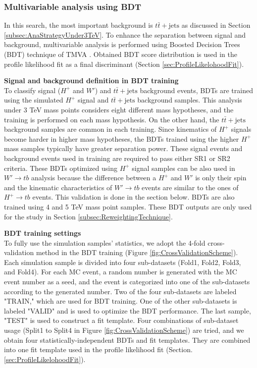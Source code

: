 \subsubsection{Multivariable analysis using BDT}
\label{subsec:MVA}

In this search, the most important background is $t\bar{t}+\text{jets}$ as discussed in Section \ref{subsec:AnaStrategyUnder3TeV}. To enhance the separation between signal and background, multivariable analysis is performed using Boosted Decision Trees (BDT) technique of TMVA \cite{TMVA}. Obtained BDT score distribution is used in the profile likelihood fit as a final discriminant (Section \ref{sec:ProfileLikelohoodFit}).

\begin{description}
    \item{\textbf{Signal and background definition in BDT training}}\mbox{}\\
    To classify signal ($H^{+}$ and $W'$) and $t\bar{t}+\text{jets}$ background events, BDTs are trained using the simulated $H^{+}$ signal and $t\bar{t}+\text{jets}$ background samples. This analysis under 3 TeV mass points considers eight different mass hypotheses, and the training is performed on each mass hypothesis. On the other hand, the $t\bar{t}+\text{jets}$ background samples are common in each training. Since kinematics of $H^+$ signals become harder in higher mass hypotheses, the BDTs trained using the higher $H^{+}$ mass samples typically have greater separation power. These signal events and background events used in training are required to pass either SR1 or SR2 criteria. These BDTs optimized using $H^{+}$ signal samples can be also used in $W' \rightarrow tb$ analysis because the difference between a $H^{+}$ and $W'$ is only their spin and the kinematic characteristics of $W' \rightarrow tb$ events are similar to the ones of $H^{+} \rightarrow tb$ events. This validation is done in the section below. BDTs are also trained using 4 and 5 TeV mass point samples. These BDT outputs are only used for the study in Section \ref{subsec:ReweightingTechnique}.

    \item{\textbf{BDT training settings}}\mbox{}\\
    To fully use the simulation samples' statistics, we adopt the 4-fold cross-validation method in the BDT training (Figure \ref{fig:CrossValidationScheme}). Each simulation sample is divided into four sub-datasets (Fold1, Fold2, Fold3, and Fold4). For each MC event, a random number is generated with the MC event number as a seed, and the event is categorized into one of the sub-datasets according to the generated number. Two of the four sub-datasets are labeled "TRAIN," which are used for BDT training. One of the other sub-datasets is labeled "VALID" and is used to optimize the BDT performance. The last sample, "TEST" is used to construct a fit template. Four combinations of sub-dataset usage (Split1 to Split4 in Figure \ref{fig:CrossValidationScheme}) are tried, and we obtain four statistically-independent BDTs and fit templates. They are combined into one fit template used in the profile likelihood fit (Section.\ref{sec:ProfileLikelohoodFit}).
    

\end{description}
